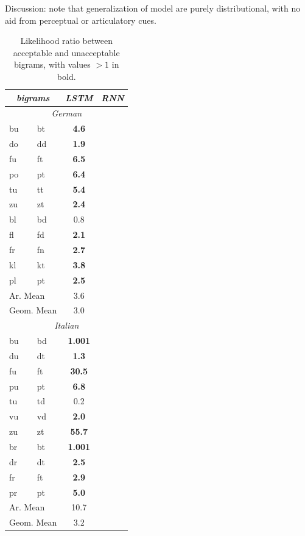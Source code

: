 Discussion: note that generalization of model are purely
distributional, with no aid from perceptual or articulatory cues.



\begin{table}[t]
  \begin{center}
    \begin{tabular}{ll|cc}
      \multicolumn{2}{c}{\emph{bigrams}}&\emph{LSTM}&\emph{RNN}\\
      \hline
      \multicolumn{4}{c}{\emph{German}}\\
      \hline
           bu &  bt &  \textbf{ 4.6} \\
           do &  dd &  \textbf{ 1.9} \\
           fu &  ft &  \textbf{ 6.5} \\
           po &  pt &  \textbf{ 6.4} \\
           tu &  tt &  \textbf{ 5.4} \\
           zu &  zt &  \textbf{ 2.4} \\ \hline
    bl &  bd & 0.8 \\
           fl &  fd &  \textbf{ 2.1} \\
           fr &  fn &  \textbf{ 2.7} \\
           kl &  kt &  \textbf{ 3.8} \\
           pl &  pt &  \textbf{ 2.5} \\ \hline
	    \multicolumn{2}{l|}{Ar. Mean}      & 3.6 \\
	    \multicolumn{2}{l|}{Geom. Mean} & 3.0 \\
      \hline
      \multicolumn{4}{c}{\emph{Italian}}\\
      \hline
	    bu & bd & \textbf{ 1.001} \\
	    du & dt & \textbf{ 1.3} \\
	    fu & ft & \textbf{ 30.5} \\
	    pu & pt & \textbf{ 6.8} \\
	    tu & td &  0.2 \\
	    vu & vd & \textbf{ 2.0} \\
	    zu & zt & \textbf{ 55.7} \\ \hline
	    br & bt & \textbf{ 1.001} \\
	    dr & dt & \textbf{ 2.5} \\
	    fr & ft & \textbf{ 2.9} \\
	    pr & pt & \textbf{ 5.0} \\ \hline
	    \multicolumn{2}{l|}{Ar. Mean} & 10.7 \\
	    \multicolumn{2}{l|}{Geom. Mean} & 3.2 \\
    \end{tabular}
  \end{center}
  \caption{\label{tab:phonotactics-results} Likelihood ratio between acceptable and unacceptable bigrams,    with values $>1$ in bold.}
\end{table}



